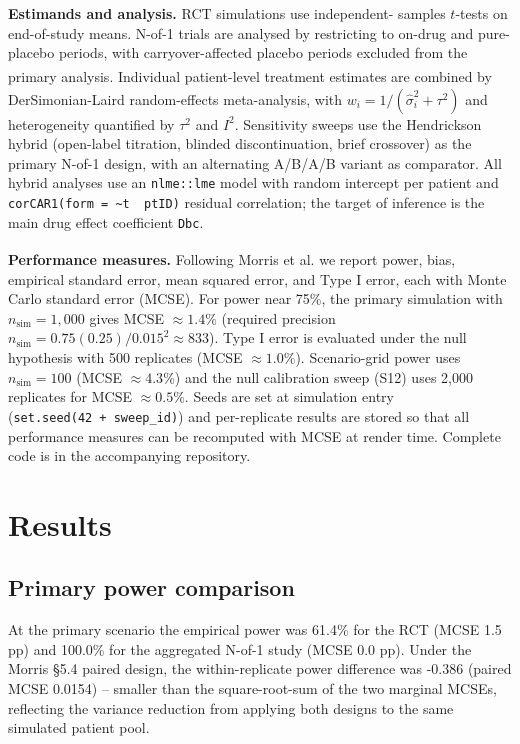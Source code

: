 \documentclass[
  11pt,
]{article}
\begin{document}
\textbf{Estimands and analysis.} RCT simulations use independent-
samples \(t\)-tests on end-of-study means. N-of-1 trials are analysed by
restricting to on-drug and pure-placebo periods, with carryover-affected
placebo periods excluded from the primary
analysis\textsuperscript{}.
Individual patient-level treatment estimates are combined by
DerSimonian-Laird random-effects
meta-analysis\textsuperscript{},
with \(w_{i} = 1/(\hat{\sigma}_{i}^{2} + \tau^{2})\) and heterogeneity
quantified by \(\tau^{2}\) and \(I^{2}\). Sensitivity sweeps use the
Hendrickson hybrid (open-label titration, blinded discontinuation, brief
crossover) as the primary N-of-1 design, with an alternating A/B/A/B
variant as comparator. All hybrid analyses use an \texttt{nlme::lme}
model with random intercept per patient and
\texttt{corCAR1(form\ =\ \textasciitilde{}t\ \textbar{}\ ptID)} residual
correlation; the target of inference is the main drug effect coefficient
\texttt{Dbc}.

\textbf{Performance measures.} Following Morris et
al.\textsuperscript{} we report power,
bias, empirical standard error, mean squared error, and Type I error,
each with Monte Carlo standard error (MCSE). For power near 75\%, the
primary simulation with \(n_{\text{sim}} = 1{,}000\) gives MCSE
\(\approx 1.4\%\) (required precision
\(n_{\text{sim}} = 0.75(0.25)/0.015^{2} \approx 833\)). Type I error is
evaluated under the null hypothesis with 500 replicates (MCSE
\(\approx 1.0\%\)). Scenario-grid power uses \(n_{\text{sim}} = 100\)
(MCSE \(\approx 4.3\%\)) and the null calibration sweep (S12) uses 2,000
replicates for MCSE \(\approx
0.5\%\). Seeds are set at simulation entry
(\texttt{set.seed(42\ +\ sweep\_id)}) and per-replicate results are
stored so that all performance measures can be recomputed with MCSE at
render time. Complete code is in the accompanying repository.

\section{Results}\label{results}

\subsection{Primary power comparison}\label{primary-power-comparison}

At the primary scenario the empirical power was 61.4\% for the RCT (MCSE
1.5 pp) and 100.0\% for the aggregated N-of-1 study (MCSE 0.0 pp). Under
the Morris §5.4 paired design, the within-replicate power difference was
-0.386 (paired MCSE 0.0154) -- smaller than the square-root-sum of the
two marginal MCSEs, reflecting the variance reduction from applying both
designs to the same simulated patient pool.
\end{document}
